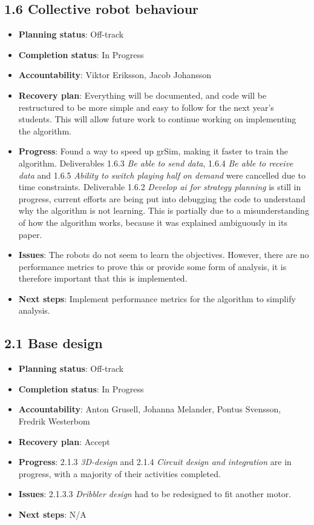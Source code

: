 
\subsection*{1.6 Collective robot behaviour}
\begin{itemize}
    \item \textbf{Planning status}: Off-track
    \item \textbf{Completion status}: In Progress
    \item \textbf{Accountability}: Viktor Eriksson, Jacob Johansson
    \item \textbf{Recovery plan}: Everything will be documented, and code will be restructured to be more simple and easy to follow for the next year's students. This will allow future work to continue working on implementing the algorithm.
    \item \textbf{Progress}: Found a way to speed up grSim, making it faster to train the algorithm. Deliverables 1.6.3 \textit{Be able to send data}, 1.6.4 \textit{Be able to receive data} and 1.6.5 \textit{Ability to switch playing half on demand} were cancelled due to time constraints. Deliverable 1.6.2 \textit{Develop \acs{ai} for strategy planning} is still in progress, current efforts are being put into debugging the code to understand why the algorithm is not learning. This is partially due to a misunderstanding of how the algorithm works, because it was explained ambiguously in its paper.
    \item \textbf{Issues}: The robots do not seem to learn the objectives. However, there are no performance metrics to prove this or provide some form of analysis, it is therefore important that this is implemented.
    \item \textbf{Next steps}: Implement performance metrics for the algorithm to simplify analysis.
\end{itemize}


\subsection*{2.1 Base design}
\begin{itemize}
    \item \textbf{Planning status}: Off-track
    \item \textbf{Completion status}: In Progress
    \item \textbf{Accountability}: Anton Grusell, Johanna Melander, Pontus Svensson, Fredrik Westerbom
    \item \textbf{Recovery plan}: Accept
    \item \textbf{Progress}: 2.1.3 \textit{3D-design} and 2.1.4 \textit{Circuit design and integration} are in progress, with a majority of their activities completed.
    \item \textbf{Issues}: 2.1.3.3 \textit{Dribbler design} had to be redesigned to fit another motor.
    \item \textbf{Next steps}: N/A 
\end{itemize}

